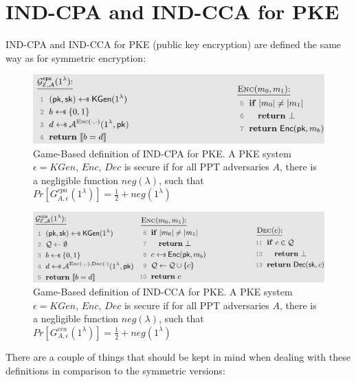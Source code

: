 \section{IND-CPA and IND-CCA for PKE}

IND-CPA and IND-CCA for PKE (public key encryption) are defined the same way as for symmetric encryption:

\begin{figure}[h]
    \center
    \includegraphics[width=\linewidth]{gfx/IND-CPA_PKE.png}
    \caption{Game-Based definition of IND-CPA for PKE. A PKE system $\epsilon = KGen$, $Enc$, $Dec$ is secure if for all PPT adversaries $A$, there is a negligible function $neg(\lambda)$, such that $Pr[G^{cpa}_{A,\epsilon}(1^\lambda)] = \frac{1}{2} + neg(1^\lambda)$}
    \label{fig:ind-cpa-PKE}
\end{figure}

\begin{figure}[h]
    \center
    \includegraphics[width=\linewidth]{gfx/IND-CCA_PKE.png}
    \caption{Game-Based definition of IND-CCA for PKE. A PKE system $\epsilon = KGen$, $Enc$, $Dec$ is secure if for all PPT adversaries $A$, there is a negligible function $neg(\lambda)$, such that $Pr[G^{cca}_{A,\epsilon}(1^\lambda)] = \frac{1}{2} + neg(1^\lambda)$}
    \label{fig:ind-cca-PKE}
\end{figure}

There are a couple of things that should be kept in mind when dealing with these definitions in comparison to the symmetric versions:

